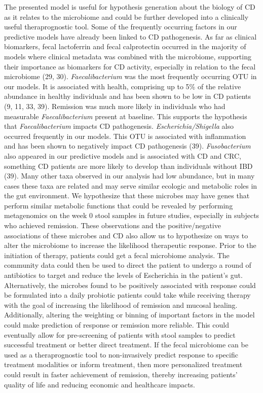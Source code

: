 \documentclass[11pt,]{article}
\begin{document}
The presented model is useful for hypothesis generation about the
biology of CD as it relates to the microbiome and could be further
developed into a clinically useful theraprognostic tool. Some of the
frequently occurring factors in our predictive models have already been
linked to CD pathogenesis. As far as clinical biomarkers, fecal
lactoferrin and fecal calprotectin occurred in the majority of models
where clinical metadata was combined with the microbiome, supporting
their importance as biomarkers for CD activity, especially in relation
to the fecal microbiome (29, 30). \emph{Faecalibacterium} was the most
frequently occurring OTU in our models. It is associated with health,
comprising up to 5\% of the relative abundance in healthy individuals
and has been shown to be low in CD patients (9, 11, 33, 39). Remission
was much more likely in individuals who had measurable
\emph{Faecalibacterium} present at baseline. This supports the
hypothesis that \emph{Faecalibacterium} impacts CD pathogenesis.
\emph{Escherichia/Shigella} also occurred frequently in our models. This
OTU is associated with inflammation and has been shown to negatively
impact CD pathogenesis (39). \emph{Fusobacterium} also appeared in our
predictive models and is associated with CD and CRC, something CD
patients are more likely to develop than individuals without IBD (39).
Many other taxa observed in our analysis had low abundance, but in many
cases these taxa are related and may serve similar ecologic and
metabolic roles in the gut environment. We hypothesize that these
microbes may have genes that perform similar metabolic functions that
could be revealed by performing metagenomics on the week 0 stool samples
in future studies, especially in subjects who achieved remission. These
observations and the positive/negative associations of these microbes
and CD also allow us to hypothesize on ways to alter the microbiome to
increase the likelihood therapeutic response. Prior to the initiation of
therapy, patients could get a fecal microbiome analysis. The community
data could then be used to direct the patient to undergo a round of
antibiotics to target and reduce the levels of Escherichia in the
patient's gut. Alternatively, the microbes found to be positively
associated with response could be formulated into a daily probiotic
patients could take while receiving therapy with the goal of increasing
the likelihood of remission and mucosal healing. Additionally, altering
the weighting or binning of important factors in the model could make
prediction of response or remission more reliable. This could eventually
allow for pre-screening of patients with stool samples to predict
successful treatment or better direct treatment. If the fecal microbiome
can be used as a theraprognostic tool to non-invasively predict response
to specific treatment modalities or inform treatment, then more
personalized treatment could result in faster achievement of remission,
thereby increasing patients' quality of life and reducing economic and
healthcare impacts.
\end{document}
